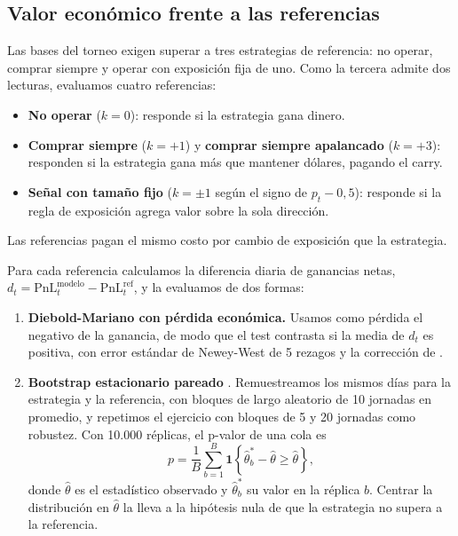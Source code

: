 \documentclass[11pt,a4paper]{article}
\begin{document}
\subsection{Valor económico frente a las referencias}

Las bases del torneo exigen superar a tres estrategias de referencia: no operar, comprar siempre y operar con exposición fija de uno. Como la tercera admite dos lecturas, evaluamos cuatro referencias:
\begin{itemize}\itemsep2pt
\item \textbf{No operar} (\(k=0\)): responde si la estrategia gana dinero.
\item \textbf{Comprar siempre} (\(k=+1\)) y \textbf{comprar siempre apalancado} (\(k=+3\)): responden si la estrategia gana más que mantener dólares, pagando el carry.
\item \textbf{Señal con tamaño fijo} (\(k=\pm1\) según el signo de \(p_t-0{,}5\)): responde si la regla de exposición agrega valor sobre la sola dirección.
\end{itemize}
Las referencias pagan el mismo costo por cambio de exposición que la estrategia.

Para cada referencia calculamos la diferencia diaria de ganancias netas, \(d_t=\text{PnL}^{\text{modelo}}_t-\text{PnL}^{\text{ref}}_t\), y la evaluamos de dos formas:
\begin{enumerate}\itemsep2pt
\item \textbf{Diebold-Mariano con pérdida económica.} Usamos como pérdida el negativo de la ganancia, de modo que el test contrasta si la media de \(d_t\) es positiva, con error estándar de Newey-West de 5 rezagos y la corrección de \citet{harvey1997}.
\item \textbf{Bootstrap estacionario pareado} \citep{politis1994}. Remuestreamos los mismos días para la estrategia y la referencia, con bloques de largo aleatorio de 10 jornadas en promedio, y repetimos el ejercicio con bloques de 5 y 20 jornadas como robustez. Con 10.000 réplicas, el p-valor de una cola es
\begin{equation}\label{eq:pboot}
p=\frac{1}{B}\sum_{b=1}^{B}\mathbf{1}\left\{\hat\theta^{*}_b-\hat\theta\ge\hat\theta\right\},
\end{equation}
donde \(\hat\theta\) es el estadístico observado y \(\hat\theta^{*}_b\) su valor en la réplica \(b\). Centrar la distribución en \(\hat\theta\) la lleva a la hipótesis nula de que la estrategia no supera a la referencia.
\end{enumerate}
\end{document}
